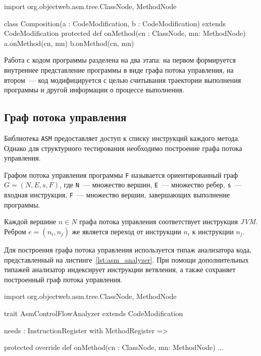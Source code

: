 \begin{snippet}[caption=Композиция модификаций кода тестируемой программы, label={lst:composition}]
  import org.objectweb.asm.tree.{ClassNode, MethodNode}

  class Composition(a : CodeModification, b : CodeModification) extends CodeModification {
    protected def onMethod(cn : ClassNode, mn: MethodNode) {
      a.onMethod(cn, mn)
      b.onMethod(cn, mn)
    }
  }
\end{snippet}

Работа с кодом программы разделена на два этапа: на первом формируется внутреннее представление программы в виде графа потока управления, на втором~--- 
код модифицируется с целью считывания траектории выполнения программы и другой информации о процессе выполнения.

\subsection{Граф потока управления}
Библиотека \texttt{ASM} предоставляет доступ к списку инструкций каждого метода. Однако для структурного тестирования необходимо построение графа потока 
управления. 

\begin{definition}
Графом потока управления программы \texttt{F} называется ориентированный граф $G=(N, E, s, F)$, где \texttt{N}~--- множество вершин, \texttt{E}~--- множество 
ребер, \texttt{s}~--- входная инструкция, \texttt{F}~--- множество вершин, завершающих выполнение программы.
\end{definition}

Каждой вершине $n \in N$ графа потока управления соответствует инструкция \textit{JVM}. Ребром $e = (n_i, n_j)$ же является переход от инструкции $n_i$ к 
инструкции $n_j$.

Для построения графа потока управления используется типаж анализатора кода, представленный на листинге~\ref{lst:asm_analyzer}. При помощи дополнительных 
типажей анализатор индексирует инструкции ветвления, а также сохраняет построенный граф потока управления.

\begin{snippet}[caption=Типаж анализатора кода, label={lst:asm_analyzer}]
  import org.objectweb.asm.tree.{ClassNode, MethodNode}
  
  trait AsmControlFlowAnalyzer extends CodeModification { 
    needs : InstructionRegister with MethodRegister =>

    protected override def onMethod(cn : ClassNode, mn: MethodNode) {
      ...
    }
  }
\end{snippet}

